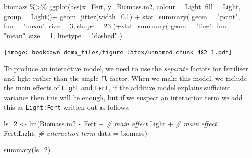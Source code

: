 \documentclass[
]{book}
\newenvironment{Shaded}{\begin{snugshade}}{\end{snugshade}}
\newcommand{\AttributeTok}[1]{\textcolor[rgb]{0.77,0.63,0.00}{#1}}
\newcommand{\CommentTok}[1]{\textcolor[rgb]{0.56,0.35,0.01}{\textit{#1}}}
\newcommand{\DecValTok}[1]{\textcolor[rgb]{0.00,0.00,0.81}{#1}}
\newcommand{\FloatTok}[1]{\textcolor[rgb]{0.00,0.00,0.81}{#1}}
\newcommand{\FunctionTok}[1]{\textcolor[rgb]{0.00,0.00,0.00}{#1}}
\newcommand{\NormalTok}[1]{#1}
\newcommand{\OtherTok}[1]{\textcolor[rgb]{0.56,0.35,0.01}{#1}}
\newcommand{\SpecialCharTok}[1]{\textcolor[rgb]{0.00,0.00,0.00}{#1}}
\newcommand{\StringTok}[1]{\textcolor[rgb]{0.31,0.60,0.02}{#1}}
\begin{document}
\begin{Shaded}
\begin{Highlighting}[]
\NormalTok{biomass }\SpecialCharTok{\%\textgreater{}\%} \FunctionTok{ggplot}\NormalTok{(}\FunctionTok{aes}\NormalTok{(}\AttributeTok{x=}\NormalTok{Fert, }\AttributeTok{y=}\NormalTok{Biomass.m2, }\AttributeTok{colour =}\NormalTok{ Light, }\AttributeTok{fill =}\NormalTok{ Light, }\AttributeTok{group =}\NormalTok{ Light))}\SpecialCharTok{+}
    \FunctionTok{geom\_jitter}\NormalTok{(}\AttributeTok{width=}\FloatTok{0.1}\NormalTok{) }\SpecialCharTok{+}
    \FunctionTok{stat\_summary}\NormalTok{(}
        \AttributeTok{geom =} \StringTok{"point"}\NormalTok{,}
        \AttributeTok{fun =} \StringTok{"mean"}\NormalTok{,}
        \AttributeTok{size =} \DecValTok{3}\NormalTok{,}
        \AttributeTok{shape =} \DecValTok{23}
\NormalTok{    )}\SpecialCharTok{+}\FunctionTok{stat\_summary}\NormalTok{(}
        \AttributeTok{geom =} \StringTok{"line"}\NormalTok{,}
        \AttributeTok{fun =} \StringTok{"mean"}\NormalTok{,}
        \AttributeTok{size =} \DecValTok{1}\NormalTok{, }\AttributeTok{linetype =} \StringTok{"dashed"}
\NormalTok{    )}
\end{Highlighting}
\end{Shaded}

\texttt{[image: bookdown-demo\_files/figure-latex/unnamed-chunk-482-1.pdf]}

To produce an interactive model, we need to use the \emph{separate} factors for fertiliser and light rather than the single \texttt{fl} factor. When we make this model, we include the main effects of \texttt{Light} and \texttt{Fert}, if the additive model explains sufficient variance then this will be enough, but if we suspect an interaction term we add this as \texttt{Light:Fert} written out as follows:

\begin{Shaded}
\begin{Highlighting}[]
\NormalTok{ls\_2 }\OtherTok{\textless{}{-}} \FunctionTok{lm}\NormalTok{(Biomass.m2 }\SpecialCharTok{\textasciitilde{}}\NormalTok{ Fert }\SpecialCharTok{+} \CommentTok{\# main effect}
\NormalTok{             Light }\SpecialCharTok{+} \CommentTok{\# main effect}
\NormalTok{             Fert}\SpecialCharTok{:}\NormalTok{Light, }\CommentTok{\# interaction term}
           \AttributeTok{data =}\NormalTok{ biomass)}

\FunctionTok{summary}\NormalTok{(ls\_2)}
\end{Highlighting}
\end{Shaded}
\end{document}
